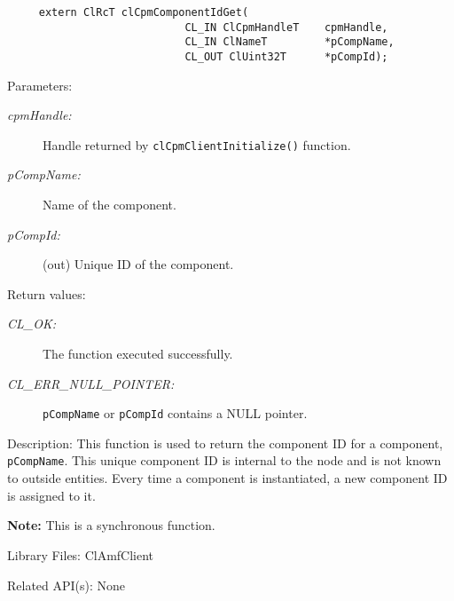 {\begin{Desc}
\footnotesize\begin{verbatim}     extern ClRcT clCpmComponentIdGet(
                			CL_IN ClCpmHandleT    cpmHandle,
                			CL_IN ClNameT         *pCompName,
                			CL_OUT ClUint32T      *pCompId);
\end{verbatim}
\normalsize
\end{Desc}
\begin{Desc}
\item[Parameters:]
\begin{description}
\item[{\em cpm\-Handle:}]Handle returned by {\tt{cl\-Cpm\-Client\-Initialize()}} function. 
\item[{\em p\-Comp\-Name:}]Name of the component. 
\item[{\em p\-Comp\-Id:}](out) Unique ID of the component.\end{description}
\end{Desc}
\begin{Desc}
\item[Return values:]
\begin{description}
\item[{\em CL\_\-OK:}]The function executed successfully. 
\item[{\em CL\_\-ERR\_\-NULL\_\-POINTER:}]{\tt{pCompName}} or {\tt{pCompId}} contains a NULL pointer.\end{description}
\end{Desc}
\begin{Desc}
\item[Description:]This function is used to return the component ID for a component, {\tt{p\-Comp\-Name}}. This unique component ID is internal to the 
node and is not known to outside entities. Every time a component is instantiated, a new component ID is assigned to it.\end{Desc}
{\bf Note:} This is a synchronous function.
\begin{Desc}
\item[Library Files:]Cl\-Amf\-Client\end{Desc}

\begin{Desc}
\item[Related API(s):]None \end{Desc}
\newpage






}
